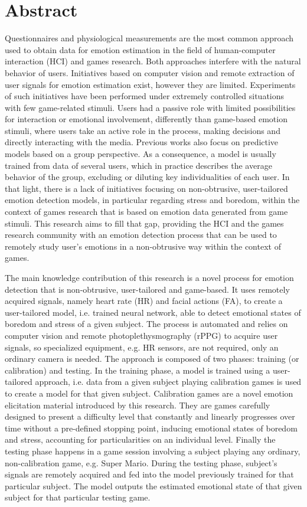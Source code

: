 \chapter*{Abstract}

Questionnaires and physiological measurements are the most common approach used to obtain data for emotion estimation in the field of human-computer interaction (HCI) and games research. Both approaches interfere with the natural behavior of users. Initiatives based on computer vision and remote extraction of user signals for emotion estimation exist, however they are limited. Experiments of such initiatives have been performed under extremely controlled situations with few game-related stimuli. Users had a passive role with limited possibilities for interaction or emotional involvement, differently than game-based emotion stimuli, where users take an active role in the process, making decisions and directly interacting with the media. Previous works also focus on predictive models based on a group perspective. As a consequence, a model is usually trained from data of several users, which in practice describes the average behavior of the group, excluding or diluting key individualities of each user. In that light, there is a lack of initiatives focusing on non-obtrusive, user-tailored emotion detection models, in particular regarding stress and boredom, within the context of games research that is based on emotion data generated from game stimuli. This research aims to fill that gap, providing the HCI and the games research community with an emotion detection process that can be used to remotely study user's emotions in a non-obtrusive way within the context of games.

The main knowledge contribution of this research is a novel process for emotion detection that is non-obtrusive, user-tailored and game-based. It uses remotely acquired signals, namely heart rate (HR) and facial actions (FA), to create a user-tailored model, i.e. trained neural network, able to detect emotional states of boredom and stress of a given subject. The process is automated and relies on computer vision and remote photoplethysmography (rPPG) to acquire user signals, so specialized equipment, e.g. HR sensors, are not required, only an ordinary camera is needed. The approach is composed of two phases: training (or calibration) and testing. In the training phase, a model is trained using a user-tailored approach, i.e. data from a given subject playing calibration games is used to create a model for that given subject. Calibration games are a novel emotion elicitation material introduced by this research. They are games carefully designed to present a difficulty level that constantly and linearly progresses over time without a pre-defined stopping point, inducing emotional states of boredom and stress, accounting for particularities on an individual level. Finally the testing phase happens in a game session involving a subject playing any ordinary, non-calibration game, e.g. Super Mario. During the testing phase, subject's signals are remotely acquired and fed into the model previously trained for that particular subject. The model outputs the estimated emotional state of that given subject for that particular testing game.

